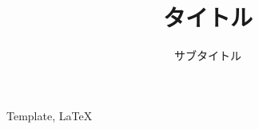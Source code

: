 \documentclass[paper]{jrsj}
\title{タイトル}
\subtitle{サブタイトル}
\begin{document}
\begin{abstract}

\end{abstract}
\begin{keywords}
Template, LaTeX
\end{keywords}
\maketitle





\begin{acknowledgements}

\end{acknowledgements}




\appendix


\begin{biography}
\end{biography}
\end{document}
